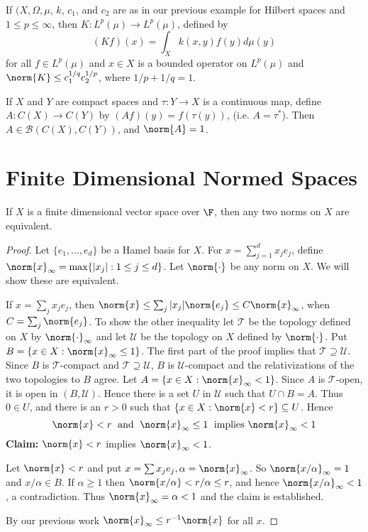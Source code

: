 \begin{eg}
    If $(X,\Omega,\mu$, $k$, $c_1$, and $c_2$ are as in our previous example for Hilbert spaces and $1 \leq p \leq \infty$, then $K:L^p(\mu)\rightarrow L^p(\mu)$, defined by $$(Kf)(x) = \int_Xk(x,y)f(y)d\mu(y)$$
    for all $f \in L^p(\mu)$ and $x \in X$ is a bounded operator on $L^p(\mu)$ and $\norm{K} \leq c_1^{1/q}c_2^{1/p}$, where $1/p+1/q = 1$.
\end{eg}

\begin{eg}
    If $X$ and $Y$ are compact spaces and $\tau:Y\rightarrow X$ is a continuous map, define $A:C(X)\rightarrow C(Y)$ by $(Af)(y) = f(\tau(y))$, (i.e. $A = \tau^*$). Then $A \in \mathscr{B}(C(X),C(Y))$, and $\norm{A} = 1$.
\end{eg}



\section{Finite Dimensional Normed Spaces}
\label{sec:FinDimNormSpc}

\begin{thm}
    If $X$ is a finite dimensional vector space over $\F$, then any two norms on $X$ are equivalent.
\end{thm}
\begin{proof}
    Let $\{e_1,...,e_d\}$ be a Hamel basis for $X$. For $x = \sum_{j=1}^dx_je_j$, define $\norm{x}_{\infty} = \max\{|x_j|:1\leq j\leq d\}$. Let $\norm{\cdot}$ be any norm on $X$. We will show these are equivalent.

    If $x = \sum_jx_je_j$, then $\norm{x} \leq \sum_j|x_j|\norm{e_j} \leq C\norm{x}_{\infty}$, when $C = \sum_j\norm{e_j}$. To show the other inequality let $\mathcal{T}$ be the topology defined on $X$ by $\norm{\cdot}_{\infty}$ and let $\mathcal{U}$ be the topology on $X$ defined by $\norm{\cdot}$. Put $B = \{x \in X:\norm{x}_{\infty} \leq 1\}$. The first part of the proof implies that $\mathcal{T} \supseteq \mathcal{U}$. Since $B$ is $\mathcal{T}$-compact and $\mathcal{T} \supseteq \mathcal{U}$, $B$ is $\mathcal{U}$-compact and the relativizations of the two topologies to $B$ agree. Let $A = \{x \in X:\norm{x}_{\infty} < 1\}$. Since $A$ is $\mathcal{T}$-open, it is open in $(B,\mathcal{U})$. Hence there is a set $U$ in $\mathcal{U}$ such that $U\cap B = A$. Thus $0 \in U$, and there is an $r > 0$ such that $\{x\in X:\norm{x} < r\} \subseteq U$. Hence $$\norm{x} < r\;\text{ and }\;\norm{x}_{\infty} \leq 1\;\text{ implies }\norm{x}_{\infty} < 1$$
    \textbf{Claim:} $\norm{x} < r$ implies $\norm{x}_{\infty} < 1$.

    Let $\norm{x} < r$ and put $x = \sum x_je_j, \alpha = \norm{x}_{\infty}$. So $\norm{x/\alpha}_{\infty} = 1$ and $x/\alpha \in B$. If $\alpha \geq 1$ then $\norm{x/\alpha} < r/\alpha \leq r$, and hence $\norm{x/\alpha}_{\infty} < 1$, a contradiction. Thus $\norm{x}_{\infty} = \alpha < 1$ and the claim is established.

    By our previous work $\norm{x}_{\infty} \leq r^{-1}\norm{x}$ for all $x$.
\end{proof}

